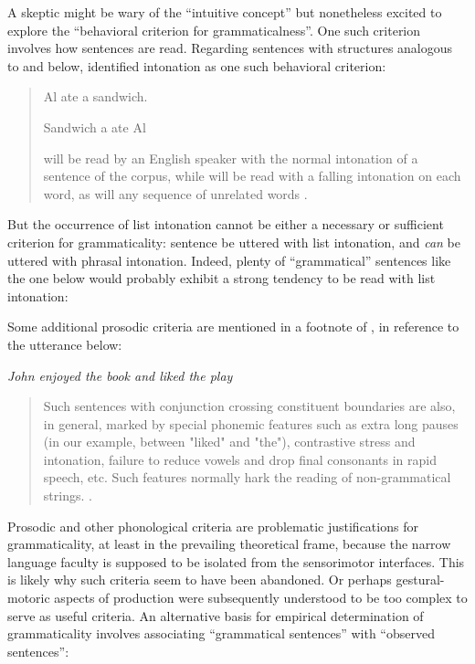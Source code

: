   A skeptic might be wary of the “intuitive concept” but nonetheless excited to explore the “behavioral criterion for grammaticalness”. One such criterion involves how sentences are read. Regarding sentences with structures analogous to  and  below, \citet{Chomsky1956} identified intonation as one such behavioral criterion:

\begin{quote} 
  
\ea\label{ex:6:1}
Al ate a sandwich.
\z


\ea\label{ex:6:2}
Sandwich a ate Al
\z

 will be read by an English speaker with the normal intonation of a sentence of the corpus, while  will be read with a falling intonation on each word, as will any sequence of unrelated words \citep[114]{Chomsky1956}.

\end{quote}


  But the occurrence of list intonation cannot be either a necessary or sufficient criterion for grammaticality: sentence   be uttered with list intonation, and  \textit{can} be uttered with phrasal intonation. Indeed, plenty of “grammatical” sentences like the one below would probably exhibit a strong tendency to be read with list intonation: 

\z

Some additional prosodic criteria are mentioned in a footnote of \citet{Chomsky1957}, in reference to the utterance below:

\ea
\textit{John enjoyed the book and liked the play}
\z

\begin{quote}
Such sentences with conjunction crossing constituent boundaries are also, in general, marked by special phonemic features such as extra long pauses (in our example, between "liked" and "the"), contrastive stress and intonation, failure to reduce vowels and drop final consonants in rapid speech, etc. Such features normally hark the reading of non-grammatical strings. \citep[35-36]{Chomsky1957}.
\end{quote}

Prosodic and other phonological criteria are problematic justifications for grammaticality, at least in the prevailing theoretical frame, because the narrow language faculty is supposed to be isolated from the sensorimotor interfaces. This is likely why such criteria seem to have been abandoned. Or perhaps gestural-motoric aspects of production were subsequently understood to be too complex to serve as useful criteria.   An alternative basis for empirical determination of grammaticality involves associating “grammatical sentences” with “observed sentences”:

